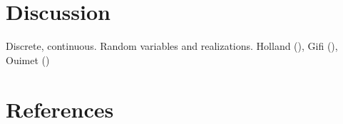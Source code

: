\documentclass[
  12pt,
  letterpaper,
  DIV=11,
  numbers=noendperiod]{scrartcl}
\newcommand{\sectionbreak}{\clearpage}
\begin{document}
\sectionbreak

\section{Discussion}\label{discussion}

Discrete, continuous. Random variables and realizations. Holland
(), Gifi
(), Ouimet
()

\sectionbreak

\section*{References}\label{references}

\label{refs}
\end{document}
